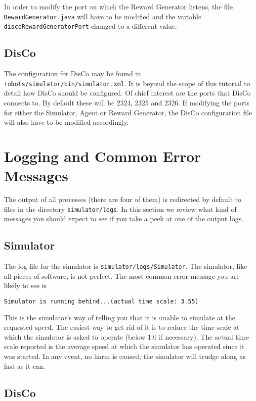 \documentclass[12pt]{article}
\begin{document}
In order to modify the port on which the Reward Generator listens, the file 
\verb+RewardGenerator.java+ will have to be modified and the variable 
\verb+discoRewardGeneratorPort+ changed to a different value.


\subsection{DisCo}

The configuration for DisCo may be found in 
\verb+robots/simulator/bin/simulator.xml+. It is beyond the scope of this
tutorial to detail how DisCo should be configured. Of chief interest are the
ports that DisCo connects to. By default these will be 2324, 2325 and 2326.
If modifying the ports for either the Simulator, Agent or Reward Generator,
the DisCo configuration file will also have to be modified accordingly.

\section{Logging and Common Error Messages}

The output of all processes (there are four of them) is redirected by default
to files in the directory \verb+simulator/logs+. In this section we review
what kind of messages you should expect to see if you take a peek at one of
the output logs.

\subsection{Simulator}

The log file for the simulator is \verb+simulator/logs/Simulator+. The 
simulator, like all pieces of software, is not perfect. The most common
error message you are likely to see is

\begin{verbatim}
Simulator is running behind...(actual time scale: 3.55)
\end{verbatim}

This is the simulator's way of telling you that it is unable to simulate
at the requested speed. The easiest way to get rid of it is to reduce the
time scale at which the simulator is asked to operate (below 1.0 if necessary).
The actual time scale reported is the average speed at which the simulator
has operated since it was started. In any event, no harm is caused; the 
simulator will trudge along as fast as it can.

\subsection{DisCo}
\end{document}
